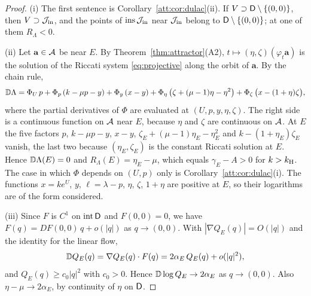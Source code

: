 \begin{proof}
(i) The first sentence is Corollary~\ref{att:cor:dulac}(ii). If $V\supset\mathsf D\setminus\{(0,0)\}$, then $V\supset\mathcal J_{\rm in}$, and the points of $\operatorname{ins}\mathcal J_{\rm in}$ near $\mathcal J_{\rm in}$ belong to $\mathsf D\setminus\{(0,0)\}$; at one of them $R_\Lambda<0$.

(ii) Let $\mathbf a\in\mathcal A$ be near $E$. By Theorem~\ref{thm:attractor}(A2), $t\mapsto(\eta,\zeta)(\varphi_t\mathbf a)$ is the solution of the Riccati system \eqref{eq:projective} along the orbit of $\mathbf a$. By the chain rule,
\[
\mathbb D\Lambda=\Phi_U\,p+\Phi_p\,(k-\mu p-y)+\Phi_y\,(x-y)+\Phi_\eta\,\bigl(\zeta+(\mu-1)\eta-\eta^2\bigr)+\Phi_\zeta\,\bigl(x-(1+\eta)\zeta\bigr),
\]
where the partial derivatives of $\Phi$ are evaluated at $(U,p,y,\eta,\zeta)$. The right side is a continuous function on $\mathcal A$ near $E$, because $\eta$ and $\zeta$ are continuous on $\mathcal A$. At $E$ the five factors $p$, $k-\mu p-y$, $x-y$, $\zeta_E+(\mu-1)\eta_E-\eta_E^2$ and $k-(1+\eta_E)\zeta_E$ vanish, the last two because $(\eta_E,\zeta_E)$ is the constant Riccati solution at $E$. Hence $\mathbb D\Lambda(E)=0$ and $R_\Lambda(E)=\eta_E-\mu$, which equals $\gamma_E-A>0$ for $k>k_{\mathrm H}$. The case in which $\Phi$ depends on $(U,p)$ only is Corollary~\ref{att:cor:dulac}(i). The functions $x=ke^U$, $y$, $\ell=\lambda-p$, $\eta$, $\zeta$, $1+\eta$ are positive at $E$, so their logarithms are of the form considered.

(iii) Since $F$ is $C^1$ on $\operatorname{int}\mathsf D$ and $F(0,0)=0$, we have $F(q)=DF(0,0)\,q+o(|q|)$ as $q\to(0,0)$. With $|\nabla Q_E(q)|=O(|q|)$ and the identity for the linear flow,
\[
\mathbb D Q_E(q)=\nabla Q_E(q)\cdot F(q)=2\alpha_E\,Q_E(q)+o(|q|^2),
\]
and $Q_E(q)\ge c_0|q|^2$ with $c_0>0$. Hence $\mathbb D\log Q_E\to2\alpha_E$ as $q\to(0,0)$. Also $\eta-\mu\to2\alpha_E$, by continuity of $\eta$ on $\mathsf D$.


\end{proof}
